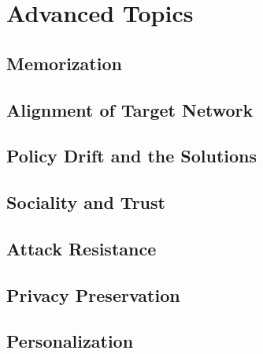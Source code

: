 %
%
%
\chapter{Advanced Topics}
\label{intro} %
\section{Memorization}
\section{Alignment of Target Network}
\section{Policy Drift and the Solutions}
\section{Sociality and Trust}
\section{Attack Resistance}
\section{Privacy Preservation}
\section{Personalization}



